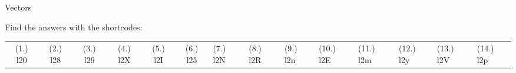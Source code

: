 \begin{eocexercises}{Vectors}
  \label{m38819**end}
  \label{59e414b70efc194a27a122db47d06ce6**end}
\par {} Find the answers with the shortcodes:
 \par \begin{tabular}[h]{cccccc}
 (1.) l20  &  (2.) l28  &  (3.) l29  &  (4.) l2X  &  (5.) l2I  &  (6.) l25  &  (7.) l2N  &  (8.) l2R  &  (9.) l2n  & 
(10.) l2E & (11.) l2m & (12.) l2y & (13.) l2V & (14.) l2p 
\end{tabular}
\end{eocexercises}
